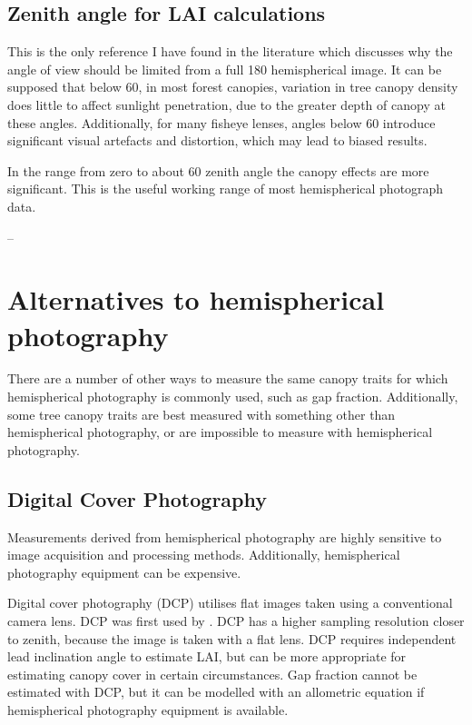 \documentclass{article}
\begin{document}
\subsection{Zenith angle for LAI calculations} \label{fov}

This is the only reference I have found in the literature which discusses why the angle of view should be limited from a full 180\textdegree{} hemispherical image. It can be supposed that below 60\textdegree{}, in most forest canopies, variation in tree canopy density does little to affect sunlight penetration, due to the greater depth of canopy at these angles. Additionally, for many fisheye lenses, angles below 60\textdegree{} introduce significant visual artefacts and distortion, which may lead to biased results. 

\begin{minipage}{\linewidth}
\begin{framed}
In the range from zero to about 60 zenith angle the canopy effects are more significant. This is the useful working range of most hemispherical photograph data.

-- \citet{Jupp2009}
\end{framed}
\end{minipage}

\section{Alternatives to hemispherical photography}

There are a number of other ways to measure the same canopy traits for which hemispherical photography is commonly used, such as gap fraction. Additionally, some tree canopy traits are best measured with something other than hemispherical photography, or are impossible to measure with hemispherical photography.

\subsection{Digital Cover Photography}

Measurements derived from hemispherical photography are highly sensitive to image acquisition and processing methods. Additionally, hemispherical photography equipment can be expensive.

Digital cover photography (DCP) utilises flat images taken using a conventional camera lens. DCP was first used by \citet{Macfarlane2007a, Macfarlane2007b, Macfarlane2007c}. DCP has a higher sampling resolution closer to zenith, because the image is taken with a flat lens. DCP requires independent lead inclination angle to estimate LAI, but can be more appropriate for estimating canopy cover in certain circumstances. Gap fraction cannot be estimated with DCP, but it can be modelled with an allometric equation if hemispherical photography equipment is available.
\end{document}
